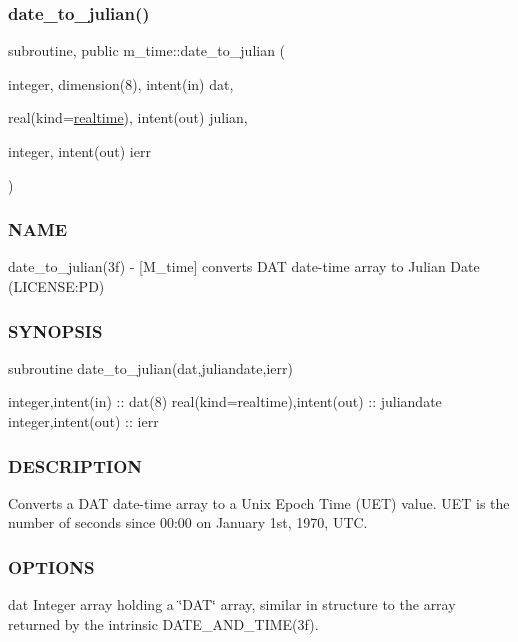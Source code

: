 \subsubsection{\texorpdfstring{date\+\_\+to\+\_\+julian()}{date\_to\_julian()}}
{\footnotesize\ttfamily subroutine, public m\+\_\+time\+::date\+\_\+to\+\_\+julian (\begin{DoxyParamCaption}\item[{integer, dimension(8), intent(in)}]{dat,  }\item[{real(kind=\mbox{\hyperlink{namespacem__time_ac10ea9e8d59ec74eaa7d89f2517d7422}{realtime}}), intent(out)}]{julian,  }\item[{integer, intent(out)}]{ierr }\end{DoxyParamCaption})}



\subsubsection*{N\+A\+ME}

date\+\_\+to\+\_\+julian(3f) -\/ \mbox{[}M\+\_\+time\mbox{]} converts D\+AT date-\/time array to Julian Date (L\+I\+C\+E\+N\+SE\+:PD) 

\subsubsection*{S\+Y\+N\+O\+P\+S\+IS}

\begin{DoxyVerb}subroutine date_to_julian(dat,juliandate,ierr)

 integer,intent(in)               :: dat(8)
 real(kind=realtime),intent(out)  :: juliandate
 integer,intent(out)              :: ierr
\end{DoxyVerb}


\subsubsection*{D\+E\+S\+C\+R\+I\+P\+T\+I\+ON}

Converts a D\+AT date-\/time array to a Unix Epoch Time (U\+ET) value. U\+ET is the number of seconds since 00\+:00 on January 1st, 1970, U\+TC.

\subsubsection*{O\+P\+T\+I\+O\+NS}

dat Integer array holding a \char`\"{}\+D\+A\+T\char`\"{} array, similar in structure to the array returned by the intrinsic D\+A\+T\+E\+\_\+\+A\+N\+D\+\_\+\+T\+I\+M\+E(3f).

